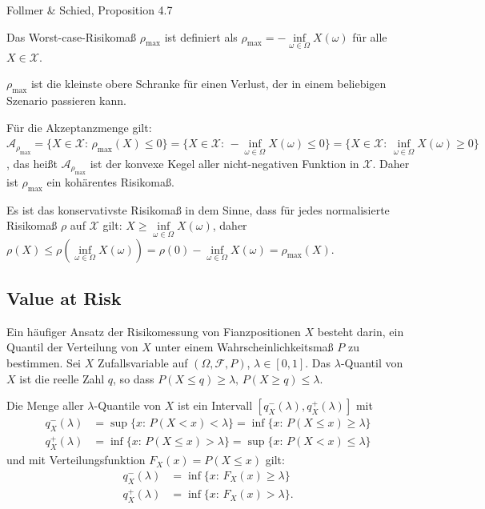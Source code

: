 \documentclass[a4paper,twoside,DIV15,BCOR12mm]{scrbook}
\begin{document}
\begin{beweis}
Follmer \& Schied, Proposition 4.7
\end{beweis}

\begin{beispiel}
Das Worst-case-Risikomaß $\rho_{\max}$ ist definiert als $\rho_{\max}=-\inf\limits_{\omega\in\Omega} X(\omega)$ für alle $X\in\mathcal{X}$.

$\rho_{\max}$ ist die kleinste obere Schranke für einen Verlust, der in einem beliebigen Szenario passieren kann.

Für die Akzeptanzmenge gilt: $\mathcal{A}_{\rho_{\max}}=\{X\in\mathcal{X}:\, \rho_{\max}(X)\leq 0\}=\{X\in\mathcal{X}:\, -\inf\limits_{\omega\in\Omega} X(\omega) \leq 0\}=\{X\in\mathcal{X}:\, \inf\limits_{\omega\in\Omega} X(\omega) \geq 0\}$, das heißt $\mathcal{A}_{\rho_{\max}}$ ist der konvexe Kegel aller nicht-negativen Funktion in $\mathcal{X}$. Daher ist $\rho_{\max}$ ein kohärentes Risikomaß.

Es ist das konservativste Risikomaß in dem Sinne, dass für jedes normalisierte Risikomaß $\rho$ auf $\mathcal{X}$ gilt: $X\geq\inf\limits_{\omega\in\Omega} X(\omega)$, daher $\rho(X)\leq \rho(\inf\limits_{\omega\in\Omega} X(\omega))=\rho(0)-\inf\limits_{\omega\in\Omega} X(\omega)=\rho_{\max}(X)$.
\end{beispiel}

\subsection{Value at Risk}

Ein häufiger Ansatz der Risikomessung von Fianzpositionen $X$ besteht darin, ein Quantil der Verteilung von $X$ unter einem Wahrscheinlichkeitsmaß $ P$ zu bestimmen. Sei $X$ Zufallsvariable auf $(\Omega,\mathcal{F}, P)$, $\lambda\in[0, 1]$. Das $\lambda$-Quantil von $X$ ist die reelle Zahl $q$, so dass $ P(X\leq q) \geq \lambda,\,  P(X\geq q) \leq \lambda$.

Die Menge aller $\lambda$-Quantile von $X$ ist ein Intervall $[q_X^-(\lambda),q_X^+(\lambda)]$ mit 
\begin{align*}
q_X^-(\lambda)&=\sup\{x:\,  P(X<x)<\lambda\}=\inf\{x:\,  P(X\leq x)\geq \lambda\} \\
q_X^+(\lambda)&=\inf\{x:\,  P(X\leq x)>\lambda\}=\sup\{x:\,  P(X < x)\leq \lambda\}
\end{align*}
und mit Verteilungsfunktion $F_X(x)= P(X\leq x)$ gilt:
\begin{align*}
q_X^-(\lambda)&=\inf\{x:\, F_X(x)\geq \lambda\}\\
q_X^+(\lambda)&=\inf\{x:\, F_X(x)> \lambda\}.
\end{align*}
\end{document}
